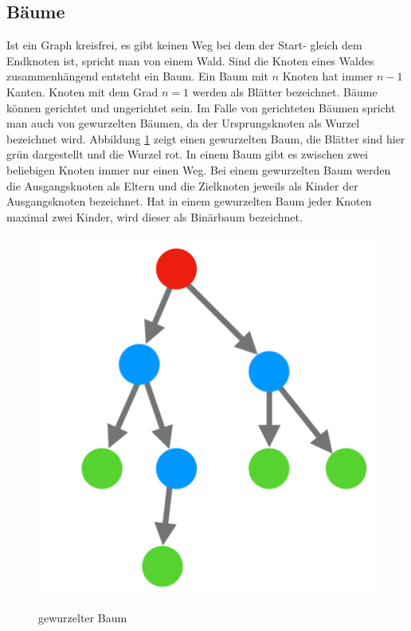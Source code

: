 \subsection{Bäume}
Ist ein Graph kreisfrei, es gibt keinen Weg bei dem der Start- gleich dem Endknoten ist, spricht man von einem Wald.
Sind die Knoten eines Waldes zusammenhängend entsteht ein Baum.
Ein Baum mit $n$ Knoten hat immer $n-1$ Kanten.\cite{basicgraphtheory}
Knoten mit dem Grad $n=1$ werden als Blätter bezeichnet.
Bäume können gerichtet und ungerichtet sein.
Im Falle von gerichteten Bäumen spricht man auch von gewurzelten Bäumen, da der Ursprungsknoten als Wurzel bezeichnet wird.
Abbildung \ref{fig:baum} zeigt einen gewurzelten Baum, die Blätter sind hier grün dargestellt und die Wurzel rot.
In einem Baum gibt es zwischen zwei beliebigen Knoten immer nur einen Weg.
Bei einem gewurzelten Baum werden die Ausgangsknoten als Eltern und die Zielknoten jeweils als Kinder der Ausgangsknoten bezeichnet.
Hat in einem gewurzelten Baum jeder Knoten maximal zwei Kinder, wird dieser als Binärbaum bezeichnet.\cite{basicgraphtheory}
\begin{figure}[H]
	\begin{center}
	\includegraphics[scale = 0.3]{./images/baum.png}
	\label{fig:baum}
    \caption{gewurzelter Baum}
	\end{center}
\end{figure}
